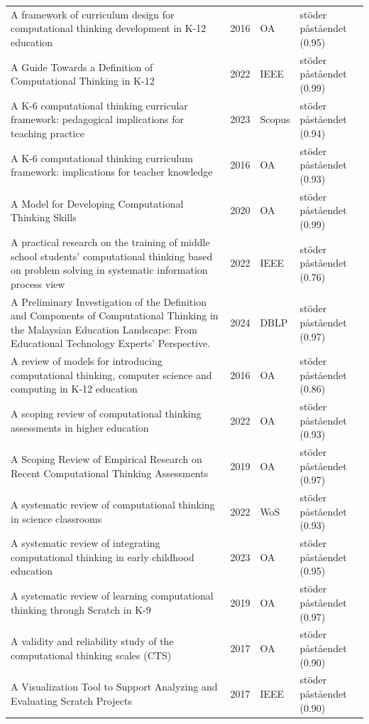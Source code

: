 \begin{longtable}{@{}%
  >{\raggedright\arraybackslash}p{}c%
  >{\raggedright\arraybackslash}p{}%
  >{\raggedright\arraybackslash}p{}@{}}
A framework of curriculum design for computational thinking development in K-12 education & 2016 & OA & stöder påståendet (0.95) \\
A Guide Towards a Definition of Computational Thinking in K-12 & 2022 & IEEE & stöder påståendet (0.99) \\
A K-6 computational thinking curricular framework: pedagogical implications for teaching practice & 2023 & Scopus & stöder påståendet (0.94) \\
A K-6 computational thinking curriculum framework: implications for teacher knowledge & 2016 & OA & stöder påståendet (0.93) \\
A Model for Developing Computational Thinking Skills & 2020 & OA & stöder påståendet (0.99) \\
A practical research on the training of middle school students' computational thinking based on problem solving in systematic information process view & 2022 & IEEE & stöder påståendet (0.76) \\
A Preliminary Investigation of the Definition and Components of Computational Thinking in the Malaysian Education Landscape: From Educational Technology Experts' Perspective. & 2024 & DBLP & stöder påståendet (0.97) \\
A review of models for introducing computational thinking, computer science and computing in K-12 education & 2016 & OA & stöder påståendet (0.86) \\
A scoping review of computational thinking assessments in higher education & 2022 & OA & stöder påståendet (0.93) \\
A Scoping Review of Empirical Research on Recent Computational Thinking Assessments & 2019 & OA & stöder påståendet (0.97) \\
A systematic review of computational thinking in science classrooms & 2022 & WoS & stöder påståendet (0.93) \\
A systematic review of integrating computational thinking in early childhood education & 2023 & OA & stöder påståendet (0.95) \\
A systematic review of learning computational thinking through Scratch in K-9 & 2019 & OA & stöder påståendet (0.97) \\
A validity and reliability study of the computational thinking scales (CTS) & 2017 & OA & stöder påståendet (0.90) \\
A Visualization Tool to Support Analyzing and Evaluating Scratch Projects & 2017 & IEEE & stöder påståendet (0.90) \\

\end{longtable}
